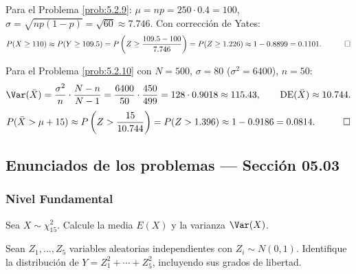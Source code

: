 \begin{solucion}
	\label{sol:5.2.9}
	Para el Problema \ref{prob:5.2.9}: $\mu = np = 250\cdot 0.4 = 100$, $\sigma=\sqrt{np(1-p)}=\sqrt{60}\approx 7.746$. Con corrección de Yates:
	\begin{align*}
		P(X\ge 110) \approx P(Y\ge 109.5) = P\left(Z \ge \frac{109.5-100}{7.746}\right) = P(Z\ge 1.226) \approx 1-0.8899 = 0.1101. \quad \qedhere
	\end{align*}
\end{solucion}

\begin{solucion}
	\label{sol:5.2.10}
	Para el Problema \ref{prob:5.2.10} con $N=500$, $\sigma=80$ ($\sigma^2=6400$), $n=50$:
	\begin{align*}
		\Var(\bar X) = \frac{\sigma^2}{n}\cdot\frac{N-n}{N-1} = \frac{6400}{50}\cdot\frac{450}{499} = 128\cdot 0.9018 \approx 115.43, \qquad \text{DE}(\bar X) \approx 10.744.
	\end{align*}
	\begin{align*}
		P(\bar X > \mu+15) \approx P\left(Z > \frac{15}{10.744}\right) = P(Z > 1.396) \approx 1-0.9186 = 0.0814. \quad \qedhere
	\end{align*}
\end{solucion}


\subsection*{Enunciados de los problemas --- Sección 05.03}

\subsubsection*{Nivel Fundamental}

\begin{problema}
	\label{prob:5.3.1}
	Sea $X \sim \chi^2_{15}$. Calcule la media $E(X)$ y la varianza $\Var(X)$.
\end{problema}

\begin{problema}
	\label{prob:5.3.2}
	Sean $Z_1, \ldots, Z_5$ variables aleatorias independientes con $Z_i \sim N(0,1)$. Identifique la distribución de $Y = Z_1^2+\cdots+Z_5^2$, incluyendo sus grados de libertad.
\end{problema}

